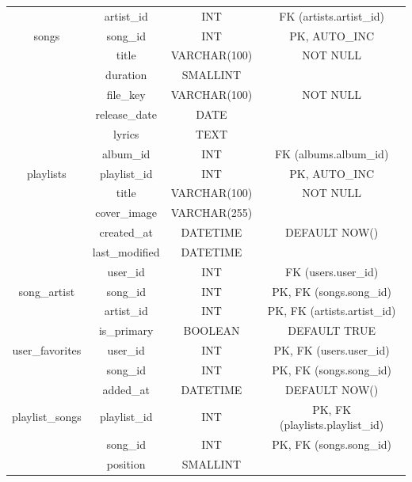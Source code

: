 \documentclass{base}
\numberwithin{figure}{section} %
\begin{document}
\begin{longtable}{@{}cccc@{}}
                & artist\_id         & INT          & FK (artists.artist\_id)         \\
songs           & song\_id           & INT          & PK, AUTO\_INC                   \\
                & title              & VARCHAR(100) & NOT NULL                        \\
                & duration           & SMALLINT     &                                 \\
                & file\_key          & VARCHAR(100) & NOT NULL                        \\
                & release\_date      & DATE         &                                 \\
                & lyrics             & TEXT         &                                 \\
                & album\_id          & INT          & FK (albums.album\_id)           \\
playlists       & playlist\_id       & INT          & PK, AUTO\_INC                   \\
                & title              & VARCHAR(100) & NOT NULL                        \\
                & cover\_image       & VARCHAR(255) &                                 \\
                & created\_at        & DATETIME     & DEFAULT NOW()                   \\
                & last\_modified     & DATETIME     &                                 \\
                & user\_id           & INT          & FK (users.user\_id)             \\
song\_artist    & song\_id           & INT          & PK, FK (songs.song\_id)         \\
                & artist\_id         & INT          & PK, FK (artists.artist\_id)     \\
                & is\_primary        & BOOLEAN      & DEFAULT TRUE                    \\
user\_favorites & user\_id           & INT          & PK, FK (users.user\_id)         \\
                & song\_id           & INT          & PK, FK (songs.song\_id)         \\
                & added\_at          & DATETIME     & DEFAULT NOW()                   \\
playlist\_songs & playlist\_id       & INT          & PK, FK (playlists.playlist\_id) \\
                & song\_id           & INT          & PK, FK (songs.song\_id)         \\
                & position           & SMALLINT     &                                 \\* \bottomrule
\end{longtable}
\end{document}
